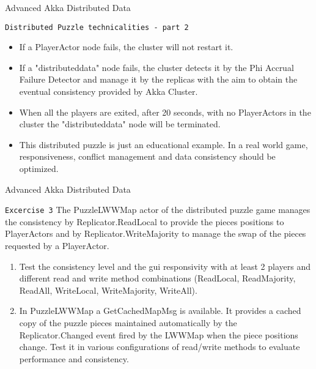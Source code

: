 \documentclass[presentation,apice]{beamer}\mode<presentation>{\usetheme{AMSBolognaFC}}
\begin{document}
\begin{frame}[c,fragile]{Advanced Akka Distributed Data}
\begin{block}{\texttt{Distributed Puzzle technicalities - part 2}}
\begin{itemize}
    \item If a PlayerActor node fails, the cluster will not restart it.
    \item If a "distributeddata" node fails, the cluster detects it by the Phi Accrual Failure Detector and manage it by the replicas with the aim to obtain the eventual consistency provided by Akka Cluster.
    \item When all the players are exited, after 20 seconds, with no PlayerActors in the cluster the "distributeddata" node will be terminated.
    \item This distributed puzzle is just an educational example. In a real world game, responsiveness, conflict management and data consistency should be optimized.
\end{itemize}
\end{block}
\end{frame}

\begin{frame}[c,fragile]{Advanced Akka Distributed Data}
\begin{block}{\texttt{Excercise 3}}
The PuzzleLWWMap actor of the distributed puzzle game manages the consistency by Replicator.ReadLocal to provide the pieces positions to PlayerActors and by Replicator.WriteMajority to manage the swap of the pieces requested by a PlayerActor.
\\
\begin{enumerate}
    \item Test the consistency level and the gui responsivity with at least 2 players and different read and write method combinations (ReadLocal, ReadMajority, ReadAll, WriteLocal, WriteMajority, WriteAll).
    \item In PuzzleLWWMap a GetCachedMapMsg is available. It provides a cached copy of the puzzle pieces maintained automatically by the Replicator.Changed event fired by the LWWMap when the piece positions change.
Test it in various configurations of read/write methods to evaluate performance and consistency.
\end{enumerate}
\end{block}
\end{frame}
\end{document}
